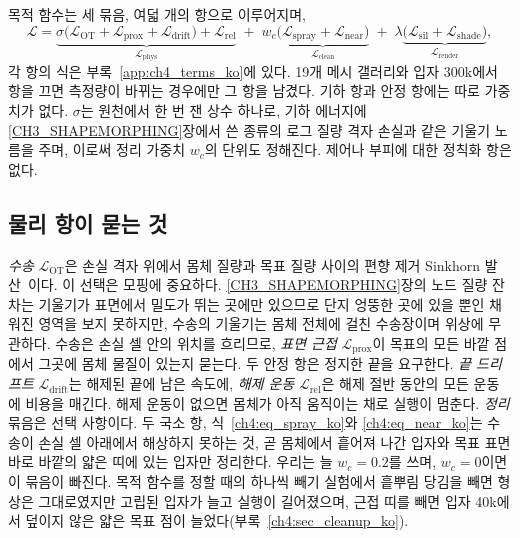 목적 함수는 세 묶음, 여덟 개의 항으로 이루어지며,
\begin{equation}
\label{ch4:eq_objective_ko}
\mathcal{L}=\underbrace{\sigma\big(\mathcal{L}_{\mathrm{OT}}+\mathcal{L}_{\mathrm{prox}}+\mathcal{L}_{\mathrm{drift}}\big)
 +\mathcal{L}_{\mathrm{rel}}}_{\mathcal{L}_{\mathrm{phys}}}
 \;+\;w_c\underbrace{\big(\mathcal{L}_{\mathrm{spray}}+\mathcal{L}_{\mathrm{near}}\big)}_{\mathcal{L}_{\mathrm{clean}}}
 \;+\;\lambda\underbrace{\big(\mathcal{L}_{\mathrm{sil}}+\mathcal{L}_{\mathrm{shade}}\big)}_{\mathcal{L}_{\mathrm{render}}} ,
\end{equation}
각 항의 식은 부록~\ref{app:ch4_terms_ko}에 있다. 19개 메시 갤러리와 입자 300k에서 항을 끄면 측정량이 바뀌는 경우에만 그
항을 남겼다. 기하 항과 안정 항에는 따로 가중치가 없다. $\sigma$는 원천에서 한 번 잰 상수 하나로, 기하 에너지에
\ref{CH3_SHAPEMORPHING}장에서 쓴 종류의 로그 질량 격자 손실과 같은 기울기 노름을 주며, 이로써 정리 가중치 $w_c$의 단위도 정해진다. 제어나 부피에 대한 정칙화 항은 없다.

\subsection{물리 항이 묻는 것}
\emph{수송} $\mathcal{L}_{\mathrm{OT}}$은 손실 격자 위에서 몸체 질량과 목표 질량 사이의 편향 제거 Sinkhorn
발산~\citep{feydy2019sinkhorn}이다. 이 선택은 모핑에 중요하다. \ref{CH3_SHAPEMORPHING}장의 노드 질량 잔차는 기울기가 표면에서
밀도가 뛰는 곳에만 있으므로 단지 엉뚱한 곳에 있을 뿐인 채워진 영역을 보지 못하지만, 수송의 기울기는 몸체 전체에 걸친
수송장이며 위상에 무관하다. 수송은 손실 셀 안의 위치를 흐리므로, \emph{표면 근접} $\mathcal{L}_{\mathrm{prox}}$이 목표의 모든
바깥 점에서 그곳에 몸체 물질이 있는지 묻는다. 두 안정 항은 정지한 끝을 요구한다. \emph{끝 드리프트}
$\mathcal{L}_{\mathrm{drift}}$는 해제된 끝에 남은 속도에, \emph{해제 운동} $\mathcal{L}_{\mathrm{rel}}$은 해제 절반 동안의 모든
운동에 비용을 매긴다. 해제 운동이 없으면 몸체가 아직 움직이는 채로 실행이 멈춘다. \emph{정리} 묶음은 선택 사항이다. 두
국소 항, 식~\eqref{ch4:eq_spray_ko}와 \eqref{ch4:eq_near_ko}는 수송이 손실 셀 아래에서 해상하지 못하는 것, 곧 몸체에서
흩어져 나간 입자와 목표 표면 바로 바깥의 얇은 띠에 있는 입자만 정리한다. 우리는 늘 $w_c=0.2$를 쓰며, $w_c=0$이면 이 묶음이
빠진다. 목적 함수를 정할 때의 하나씩 빼기 실험에서 흩뿌림 당김을 빼면 형상은 그대로였지만 고립된 입자가 늘고 실행이
길어졌으며, 근접 띠를 빼면 입자 40k에서 덮이지 않은 얇은 목표 점이 늘었다(부록~\ref{ch4:sec_cleanup_ko}).


